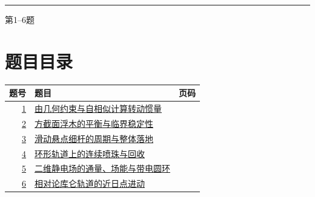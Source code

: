 \documentclass[UTF8,fontset=fandol,a4paper,11pt]{ctexart}
\begin{document}

\thispagestyle{empty}\vspace*{22mm}

\par\vspace{12mm}

\par\vspace{12mm}

\par\vspace{9mm}

\noindent\textcolor{accent}{\rule{\linewidth}{1pt}}\par\vspace{9mm}

\noindent 第1--6题\par\vfill\clearpage

\section*{题目目录}

\begin{longtable}{@{}r p{113mm} r@{}}\toprule 题号 & 题目 & 页码\\\midrule

\hyperref[q:1]{1} & \hyperref[q:1]{由几何约束与自相似计算转动惯量} & \pageref{q:1} \\

\hyperref[q:2]{2} & \hyperref[q:2]{方截面浮木的平衡与临界稳定性} & \pageref{q:2} \\

\hyperref[q:3]{3} & \hyperref[q:3]{滑动悬点细杆的周期与整体落地} & \pageref{q:3} \\

\hyperref[q:4]{4} & \hyperref[q:4]{环形轨道上的连续喷珠与回收} & \pageref{q:4} \\

\hyperref[q:5]{5} & \hyperref[q:5]{二维静电场的通量、场能与带电圆环} & \pageref{q:5} \\

\hyperref[q:6]{6} & \hyperref[q:6]{相对论库仑轨道的近日点进动} & \pageref{q:6} \\

\bottomrule\end{longtable}

\clearpage
\end{document}
